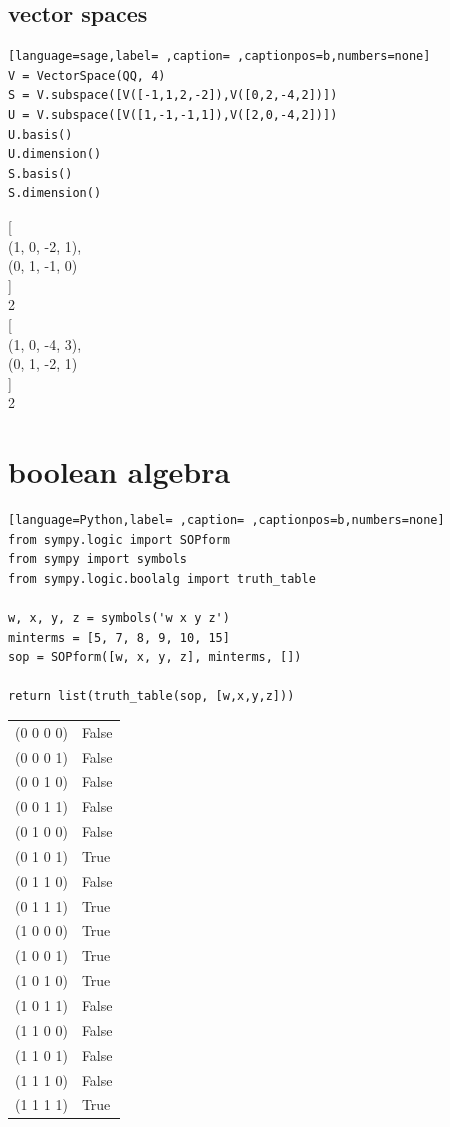 \documentclass[a4paper,12pt]{article}
\begin{document}
\subsection{vector spaces}
\label{sec:orgcf27a80}
\begin{lstlisting}[language=sage,label= ,caption= ,captionpos=b,numbers=none]
V = VectorSpace(QQ, 4)
S = V.subspace([V([-1,1,2,-2]),V([0,2,-4,2])])
U = V.subspace([V([1,-1,-1,1]),V([2,0,-4,2])])
U.basis()
U.dimension()
S.basis()
S.dimension()
\end{lstlisting}

[\\[0pt]
(1, 0, -2, 1),\\[0pt]
(0, 1, -1, 0)\\[0pt]
]\\[0pt]
2\\[0pt]
[\\[0pt]
(1, 0, -4, 3),\\[0pt]
(0, 1, -2, 1)\\[0pt]
]\\[0pt]
2\\[0pt]

\section{boolean algebra}
\label{sec:org51174d3}
\begin{lstlisting}[language=Python,label= ,caption= ,captionpos=b,numbers=none]
from sympy.logic import SOPform
from sympy import symbols
from sympy.logic.boolalg import truth_table

w, x, y, z = symbols('w x y z')
minterms = [5, 7, 8, 9, 10, 15]
sop = SOPform([w, x, y, z], minterms, [])

return list(truth_table(sop, [w,x,y,z]))
\end{lstlisting}

\begin{tabular}{ll}
(0 0 0 0) & False\\[0pt]
(0 0 0 1) & False\\[0pt]
(0 0 1 0) & False\\[0pt]
(0 0 1 1) & False\\[0pt]
(0 1 0 0) & False\\[0pt]
(0 1 0 1) & True\\[0pt]
(0 1 1 0) & False\\[0pt]
(0 1 1 1) & True\\[0pt]
(1 0 0 0) & True\\[0pt]
(1 0 0 1) & True\\[0pt]
(1 0 1 0) & True\\[0pt]
(1 0 1 1) & False\\[0pt]
(1 1 0 0) & False\\[0pt]
(1 1 0 1) & False\\[0pt]
(1 1 1 0) & False\\[0pt]
(1 1 1 1) & True\\[0pt]
\end{tabular}
\end{document}

